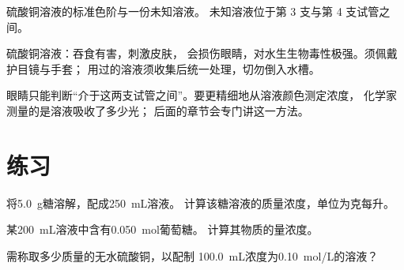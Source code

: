 \begin{omfigure}

{\small 硫酸铜溶液的标准色阶与一份未知溶液。
未知溶液位于第 3 支与第 4 支试管之间。}
\end{omfigure}

\begin{safety}{}
硫酸铜溶液：吞食有害，刺激皮肤，
会损伤眼睛，对水生生物毒性极强。须佩戴护目镜与手套；
用过的溶液须收集后统一处理，切勿倒入水槽。
\end{safety}

\begin{remark}[眼睛的局限]\label{rem:g10:concentration-and-dilution:eye}
眼睛只能判断“介于这两支试管之间”。要更精细地从溶液颜色测定浓度，
化学家测量的是溶液吸收了多少光；
后面的章节会专门讲这一方法。
\end{remark}

\section{练习}

\begin{exercise}[$\star$]\label{exo:g10:concentration-and-dilution:1}
将\qty{5.0}{g}糖溶解，配成\qty{250}{mL}溶液。
计算该糖溶液的质量浓度，单位为克每升。
\end{exercise}

\begin{exercise}[$\star$]\label{exo:g10:concentration-and-dilution:2}
某\qty{200}{mL}溶液中含有\qty{0.050}{mol}葡萄糖。
计算其物质的量浓度。
\end{exercise}

\begin{exercise}[$\star$]\label{exo:g10:concentration-and-dilution:3}
需称取多少质量的无水硫酸铜，以配制
\qty{100.0}{mL}浓度为\qty{0.10}{mol/L}的溶液？
\end{exercise}

